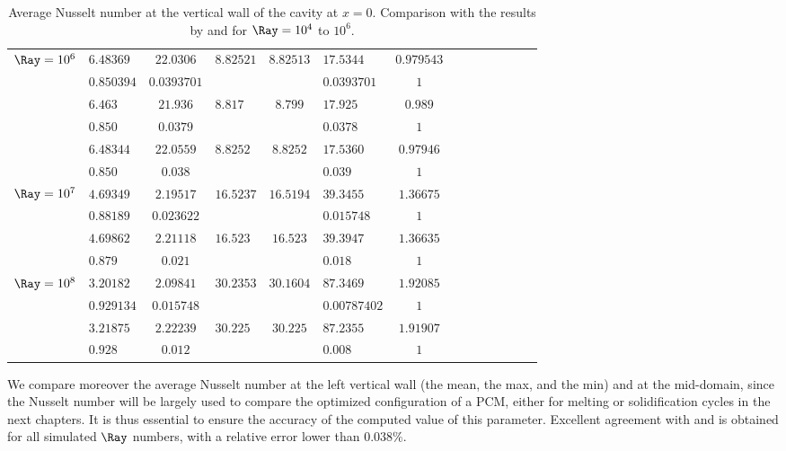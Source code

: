 \begin{table}
\begin{center}
\begin{tabular}{*{7}{cl}}
          \multirow{2}{*}{$\Ray = 10^6$} & $6.48369$ & $22.0306$ & \multirow{2}{*}{$8.82521$} & \multirow{2}{*}{$8.82513 $} & $17.5344$ & $0.979543$  \\
          & $0.850394$ & $0.0393701$ & & & $0.0393701$ & $1$ \\ 
          \multirow{2}{*}{\cite{de1983natural}} & $6.463$ & $21.936 $ & \multirow{2}{*}{$8.817$} & \multirow{2}{*}{$8.799 $} & $17.925$ & $0.989$  \\
          & $0.850$ & $0.0379$ & & & $0.0378$ & $1$ \\
          \multirow{2}{*}{\cite{LeQuere91}} & $6.48344$ & $22.0559 $ & \multirow{2}{*}{$8.8252$} & \multirow{2}{*}{$8.8252 $} & $17.5360$ & $0.97946$  \\
          & $0.850$ & $0.038$ & & & $0.039$ & $1$ \\ \hline
          
          \multirow{2}{*}{$\Ray = 10^7$} & $4.69349$ & $2.19517$ & \multirow{2}{*}{$16.5237$} & \multirow{2}{*}{$16.5194 $} & $39.3455$ & $1.36675$  \\
          & $0.88189$ & $0.023622$ & & & $0.015748$ & $1$ \\ 
          \multirow{2}{*}{\cite{LeQuere91}} & $4.69862$ & $2.21118 $ & \multirow{2}{*}{$16.523$} & \multirow{2}{*}{$16.523 $} & $39.3947$ & $1.36635$  \\
          & $0.879$ & $0.021$ & & & $0.018$ & $1$ \\ \hline

          \multirow{2}{*}{$\Ray = 10^8$} & $3.20182$ & $2.09841$ & \multirow{2}{*}{$30.2353$} & \multirow{2}{*}{$30.1604 $} & $87.3469$ & $1.92085$  \\
          & $0.929134$ & $0.015748$ & & & $0.00787402$ & $1$ \\ 
          \multirow{2}{*}{\cite{LeQuere91}} & $3.21875$ & $2.22239 $ & \multirow{2}{*}{$30.225$} & \multirow{2}{*}{$30.225 $} & $87.2355$ & $1.91907$  \\
          & $0.928$ & $0.012$ & & & $0.008$ & $1$ \\ \bottomrule
          
               \end{tabular}
   \end{center}
   \caption{Average Nusselt number at the vertical wall of the cavity at $x=0$. Comparison with the results by \cite{de1983natural} and \cite{LeQuere91} for $\Ray= 10^4$ to $10^6$.}
   \label{tab-Nu-natconv}
\end{table}
We compare moreover the average Nusselt number at the left vertical wall (the mean, the max, and the min) and at the mid-domain, 
since the Nusselt number will be largely used to compare the optimized configuration of a PCM, either for melting or solidification cycles in the next chapters.
It is thus essential to ensure the accuracy of the computed value of this parameter.
Excellent agreement with \cite{de1983natural} and \cite{LeQuere91} is obtained for all simulated $\Ray$ numbers, with a relative error lower than $0.038 \%$.

